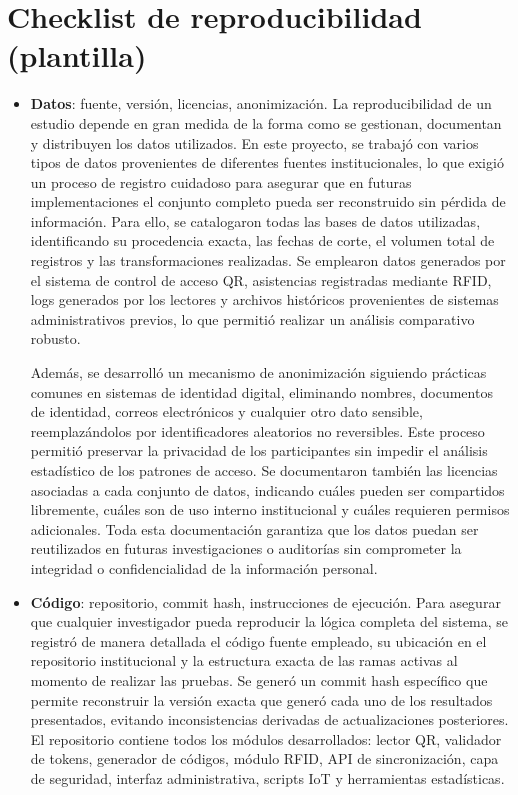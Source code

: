 \appendix
\section{Checklist de reproducibilidad (plantilla)}
\begin{itemize}[leftmargin=*]

  \item \textbf{Datos}: fuente, versión, licencias, anonimización.  
  La reproducibilidad de un estudio depende en gran medida de la forma como se gestionan, documentan y distribuyen los datos utilizados. En este proyecto, se trabajó con varios tipos de datos provenientes de diferentes fuentes institucionales, lo que exigió un proceso de registro cuidadoso para asegurar que en futuras implementaciones el conjunto completo pueda ser reconstruido sin pérdida de información. Para ello, se catalogaron todas las bases de datos utilizadas, identificando su procedencia exacta, las fechas de corte, el volumen total de registros y las transformaciones realizadas. Se emplearon datos generados por el sistema de control de acceso QR, asistencias registradas mediante RFID, logs generados por los lectores y archivos históricos provenientes de sistemas administrativos previos, lo que permitió realizar un análisis comparativo robusto.

  Además, se desarrolló un mecanismo de anonimización siguiendo prácticas comunes en sistemas de identidad digital, eliminando nombres, documentos de identidad, correos electrónicos y cualquier otro dato sensible, reemplazándolos por identificadores aleatorios no reversibles. Este proceso permitió preservar la privacidad de los participantes sin impedir el análisis estadístico de los patrones de acceso. Se documentaron también las licencias asociadas a cada conjunto de datos, indicando cuáles pueden ser compartidos libremente, cuáles son de uso interno institucional y cuáles requieren permisos adicionales. Toda esta documentación garantiza que los datos puedan ser reutilizados en futuras investigaciones o auditorías sin comprometer la integridad o confidencialidad de la información personal.

  \item \textbf{Código}: repositorio, commit hash, instrucciones de ejecución.  
  Para asegurar que cualquier investigador pueda reproducir la lógica completa del sistema, se registró de manera detallada el código fuente empleado, su ubicación en el repositorio institucional y la estructura exacta de las ramas activas al momento de realizar las pruebas. Se generó un commit hash específico que permite reconstruir la versión exacta que generó cada uno de los resultados presentados, evitando inconsistencias derivadas de actualizaciones posteriores. El repositorio contiene todos los módulos desarrollados: lector QR, validador de tokens, generador de códigos, módulo RFID, API de sincronización, capa de seguridad, interfaz administrativa, scripts IoT y herramientas estadísticas.


\end{itemize}
